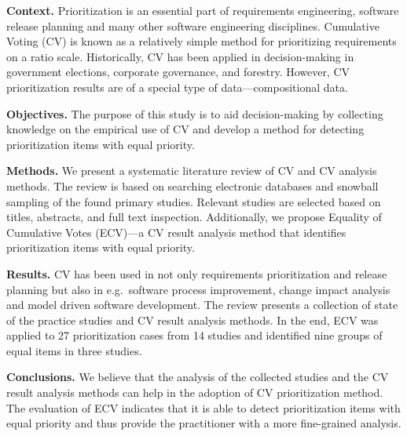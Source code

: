 
\textbf{Context.}
Prioritization is an essential part of requirements engineering, software release planning and many other software engineering disciplines.
Cumulative Voting (CV) is known as a relatively simple method for prioritizing requirements on a ratio scale.
Historically, CV has been applied in decision-making in government elections, corporate governance, and forestry.
However, CV prioritization results are of a special type of data---compositional data.

\textbf{Objectives.}
The purpose of this study is to aid decision-making by collecting knowledge on the empirical use of CV and develop a method for detecting prioritization items with equal priority.

\textbf{Methods.}
We present a systematic literature review of CV and CV analysis methods.
The review is based on searching electronic databases and snowball sampling of the found primary studies.
Relevant studies are selected based on titles, abstracts, and full text inspection.
Additionally, we propose Equality of Cumulative Votes (ECV)---a CV result analysis method that identifies prioritization items with equal priority.

\textbf{Results.}
CV has been used in not only requirements prioritization and release planning but also in e.g.\ software process improvement, change impact analysis and model driven software development.
The review presents a collection of state of the practice studies and CV result analysis methods.
In the end, ECV was applied to 27 prioritization cases from 14 studies and identified nine groups of equal items in three studies.

\textbf{Conclusions.}
We believe that the analysis of the collected studies and the CV result analysis methods can help in the adoption of CV prioritization method.
The evaluation of ECV indicates that it is able to detect prioritization items with equal priority and thus provide the practitioner with a more fine-grained analysis.